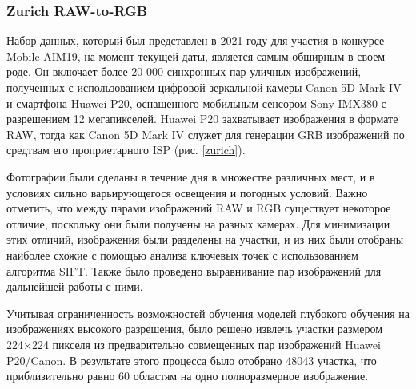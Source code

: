 \subsubsection{Zurich RAW-to-RGB}

Набор данных, который был представлен в 2021 году для участия в конкурсе Mobile AIM19, на момент текущей даты, является самым обширным в своем роде. Он включает более 20 000 синхронных пар уличных изображений, полученных с использованием цифровой зеркальной камеры Canon 5D Mark IV и смартфона Huawei P20, оснащенного мобильным сенсором Sony IMX380 с разрешением 12 мегапикселей. Huawei P20 захватывает изображения в формате RAW, тогда как Canon 5D Mark IV служет для генерации GRB изображений по средтвам его проприетарного ISP (рис. \ref{zurich}).


Фотографии были сделаны в течение дня в множестве различных мест, и в условиях сильно варьирующегося освещения и погодных условий. Важно отметить, что между парами изображений RAW и RGB существует некоторое отличие, поскольку они были получены на разных камерах. Для минимизации этих отличий, изображения были разделены на участки, и из них были отобраны наиболее схожие с помощью анализа ключевых точек с использованием алгоритма SIFT. Также было проведено выравнивание пар изображений для дальнейшей работы с ними.

Учитывая ограниченность возможностей обучения моделей глубокого обучения на изображениях высокого разрешения, было решено извлечь участки размером 224×224 пикселя из предварительно совмещенных пар изображений Huawei P20/Canon. В результате этого процесса было отобрано 48043 участка, что приблизительно равно 60 областям на одно полноразмерное изображение.